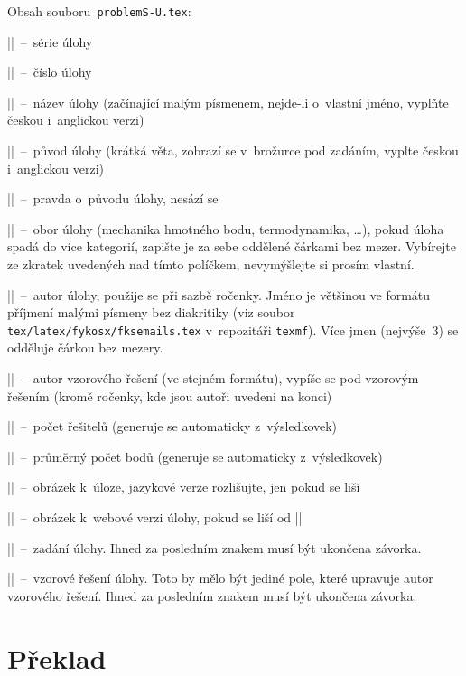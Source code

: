 \documentclass[fykos]{fksbase}
\begin{document}
Obsah souboru~\texttt{problemS-U.tex}:
\begin{compactitem}
	\item \texinline|\probbatch|~--~série úlohy
	\item \texinline|\probno|~--~číslo úlohy
	\item \texinline|\probname|~--~název úlohy (začínající malým písmenem, nejde-li
		o~vlastní jméno, vyplňte českou i~anglickou verzi)
	\item \texinline|\proborigin|~--~původ úlohy (krátká věta, zobrazí se v~brožurce pod
		zadáním, vyplte českou i~anglickou verzi)
	\item \texinline|\proborigintruth|~--~pravda o~původu úlohy, nesází se
	\item \texinline|\probtopics|~--~obor úlohy (mechanika hmotného bodu, termodynamika, \dots),
	pokud úloha spadá do více kategorií, zapište je za sebe oddělené čárkami bez mezer.
	Vybírejte ze zkratek uvedených nad tímto políčkem, nevymýšlejte si prosím vlastní.
	\item \texinline|\probauthors|~--~autor úlohy, použije se při sazbě ročenky. Jméno
	je většinou ve formátu příjmení malými písmeny bez diakritiky (viz soubor
	\texttt{tex/latex/fykosx/fksemails.tex} v~repozitáři \texttt{texmf}). Více jmen
	(nejvýše~3) se odděluje čárkou bez mezery.
	\item \texinline|\probsolauthors|~--~autor vzorového řešení (ve stejném formátu),
		vypíše se pod vzorovým řešením (kromě ročenky, kde jsou autoři uvedeni na konci)
	\item \texinline|\probsolvers|~--~počet řešitelů (generuje se automaticky
		z~výsledkovek)
	\item \texinline|\probavg|~--~průměrný počet bodů (generuje se automaticky
		z~výsledkovek)
	\item \texinline|\probfig|~--~obrázek k~úloze, jazykové verze rozlišujte,
	jen pokud se liší
	\item \texinline|\probwebfig|~--~obrázek k~webové verzi úlohy, pokud se liší od
	\texinline|\probfig|
	\item \texinline|\probtask|~--~zadání úlohy. Ihned za posledním znakem musí
	být ukončena závorka.
	\item \texinline|\probsolution|~--~vzorové řešení úlohy. Toto by mělo být jediné
		pole, které upravuje autor vzorového řešení. Ihned za posledním znakem musí být
		ukončena závorka.
\end{compactitem}

\section{Překlad}
\end{document}
